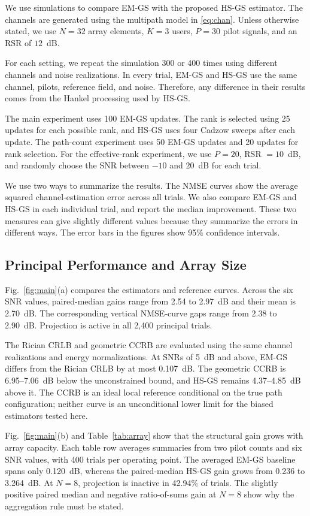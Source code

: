 \documentclass[journal]{IEEEtran}
\begin{document}
We use simulations to compare EM-GS with the proposed HS-GS estimator. The
channels are generated using the multipath model in \eqref{eq:chan}. Unless
otherwise stated, we use $N=32$ array elements, $K=3$ users, $P=30$ pilot
signals, and an RSR of $12$~dB.

For each setting, we repeat the simulation 300 or 400 times using different
channels and noise realizations. In every trial, EM-GS and HS-GS use the same
channel, pilots, reference field, and noise. Therefore, any difference in
their results comes from the Hankel processing used by HS-GS.

The main experiment uses 100 EM-GS updates. The rank is selected using 25
updates for each possible rank, and HS-GS uses four Cadzow sweeps after each
update. The path-count experiment uses 50 EM-GS updates and 20 updates for
rank selection. For the effective-rank experiment, we use $P=20$, RSR
$=10$~dB, and randomly choose the SNR between $-10$ and $20$~dB for each
trial.

We use two ways to summarize the results. The NMSE curves show the average
squared channel-estimation error across all trials. We also compare EM-GS and
HS-GS in each individual trial, and report the median improvement. These two
measures can give slightly different values because they summarize the errors
in different ways. The error bars in the figures show 95\% confidence
intervals.

\subsection{Principal Performance and Array Size}
\label{sec:main}

Fig.~\ref{fig:main}(a) compares the estimators and reference curves. Across
the six SNR values, paired-median gains range from 2.54 to 2.97~dB and
their mean is 2.70~dB. The corresponding vertical NMSE-curve gaps range
from 2.38 to 2.90~dB. Projection is active in all 2,400 principal trials.

The Rician CRLB and geometric CCRB are evaluated using the same channel
realizations and energy normalizations. At SNRs of 5~dB and above, EM-GS
differs from the Rician CRLB by at most 0.107~dB. The geometric CCRB is
6.95--7.06~dB below the unconstrained bound, and HS-GS remains
4.37--4.85~dB above it. The CCRB is an ideal local reference conditional on
the true path configuration; neither curve is an unconditional lower limit
for the biased estimators tested here.

Fig.~\ref{fig:main}(b) and Table~\ref{tab:array} show that the structural
gain grows with array capacity. Each table row averages summaries from two
pilot counts and six SNR values, with 400 trials per operating point.
The averaged EM-GS baseline spans only 0.120~dB, whereas the paired-median
HS-GS gain grows from 0.236 to 3.264~dB. At $N=8$, projection is inactive
in 42.94\% of trials. The slightly positive paired median and negative
ratio-of-sums gain at $N=8$ show why the aggregation rule must be stated.
\end{document}
